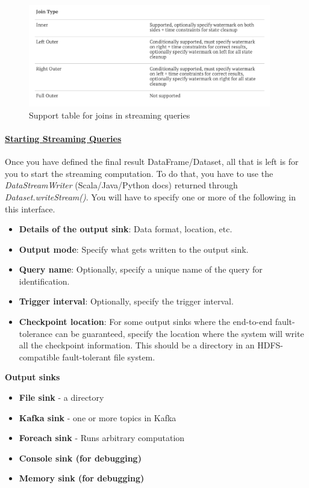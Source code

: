 \documentclass[10pt,a4paper]{article}
\begin{document}
 \begin{figure}[ht!]
 \hfill \includegraphics[width=300pt]{images/spark-stream-stream-joins}
 \hspace*{\fill}
 \caption{Support table for joins in streaming queries}
 \end{figure} 
 \paragraph{\uline{Starting Streaming Queries}}
 Once you have defined the final result DataFrame/Dataset, all that is left is for you to start the streaming computation. To do that, you have to use the \textit{DataStreamWriter} (Scala/Java/Python docs) returned through \textit{Dataset.writeStream()}. You will have to specify one or more of the following in this interface.
 \begin{itemize}
 	\item \textbf{Details of the output sink}: Data format, location, etc.
 	\item \textbf{Output mode}: Specify what gets written to the output sink.
 	\item \textbf{Query name}: Optionally, specify a unique name of the query for identification.
 	\item \textbf{Trigger interval}: Optionally, specify the trigger interval. 
 	\item \textbf{Checkpoint location}: For some output sinks where the end-to-end fault-tolerance can be guaranteed, specify the location where the system will write all the checkpoint information. This should be a directory in an HDFS-compatible fault-tolerant file system.
 \end{itemize}
 \textbf{Output sinks}
 \begin{itemize}
 	\item \textbf{File sink} - a directory
 	\item \textbf{Kafka sink} - one or more topics in Kafka
 	\item \textbf{Foreach sink} - Runs arbitrary computation
 	\item \textbf{Console sink (for debugging)}
 	\item \textbf{Memory sink (for debugging)}
 \end{itemize}
\end{document}
